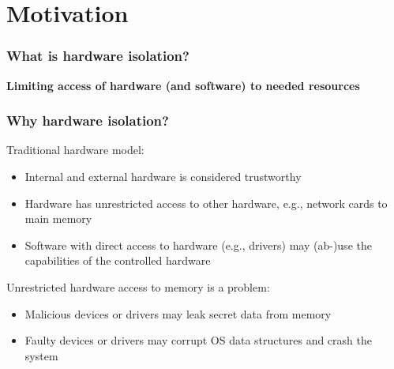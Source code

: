 \section{Motivation}

\begin{frame}
    \frametitle{What is hardware isolation?}

    \begin{center}
        \textbf{Limiting access of hardware (and software) to needed resources}
    \end{center}
\end{frame}

\begin{frame}
    \frametitle{Why hardware isolation?}

    Traditional hardware model:

    \begin{itemize}
        \item Internal and external hardware is considered trustworthy
        \item Hardware has unrestricted access to other hardware, e.g., network
            cards to main memory
        \item Software with direct access to hardware (e.g., drivers) may
            (ab-)use the capabilities of the controlled hardware
    \end{itemize}

    \vspace{1em}

    Unrestricted hardware access to memory is a problem:

    \begin{itemize}
        \item Malicious devices or drivers may leak secret data from memory
        \item Faulty devices or drivers may corrupt OS data structures and crash the system
    \end{itemize}
\end{frame}

% 
% 
% 
% 
% 

